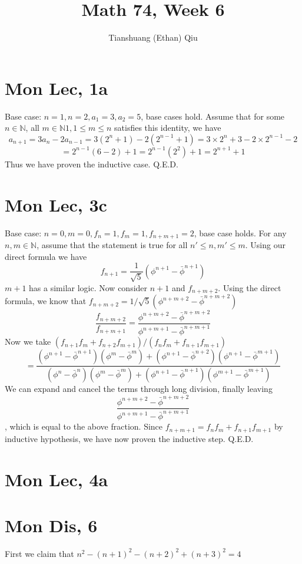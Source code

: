 \documentclass[12pt]{article}
\author{Tianshuang (Ethan) Qiu}
\newcommand{\N}{\mathbb{N}}
\begin{document}
\title{Math 74, Week 6}
\maketitle

\section{Mon Lec, 1a}
Base case: $n=1, n=2, a_1=3, a_2=5$, base cases hold.
\newline
Assume that for some $n \in \N$, all $m \in \N 1, 1 \leq m \leq n$ satisfies this identity, we have
$$a_{n+1}=3a_n-2a_{n-1}=3(2^n+1)-2(2^{n-1}+1)=3\times 2^n+3-2\times 2^{n-1}-2$$
$$=2^{n-1}(6-2)+1=2^{n-1}(2^2)+1=2^{n+1}+1$$
Thus we have proven the inductive case. Q.E.D.

\section{Mon Lec, 3c}
Base case: $n=0, m=0, f_n=1, f_m=1, f_{n+m+1}=2$, base case holds.
\newline
For any $n, m \in \N$, assume that the statement is true for all $n'\leq n, m' \leq m$. Using our direct formula we have
$$f_{n+1}=\frac{1}{\sqrt 5} (\phi^{n+1} - \bar \phi^{n+1})$$
$m+1$ has a similar logic. Now consider $n+1$ and $f_{n+m+2}$.
\newline
Using the direct formula, we know that $f_{n+m+2}=1/\sqrt5 (\phi^{n+m+2} - \bar \phi^{n+m+2})$
$$\frac{f_{n+m+2}}{f_{n+m+1}} = \frac{\phi^{n+m+2} - \bar \phi^{n+m+2}}{\phi^{n+m+1} - \bar \phi^{n+m+1}}$$
\newline
Now we take $(f_{n+1}f_m+f_{n+2}f_{m+1})/(f_{n}f_{m}+f_{n+1}f_{m+1})$
$$=\frac{(\phi^{n+1}-\bar\phi^{n+1})(\phi^{m}-\bar\phi^{m})+(\phi^{n+1}-\bar\phi^{n+2})(\phi^{n+1}-\bar\phi^{m+1})}{(\phi^{n}-\bar\phi^{n})(\phi^{m}-\bar\phi^{m})+(\phi^{n+1}-\bar\phi^{n+1})(\phi^{m+1}-\bar\phi^{m+1})}$$
We can expand and cancel the terms through long division, finally leaving $$\frac{\phi^{n+m+2} - \bar \phi^{n+m+2}}{\phi^{n+m+1} - \bar \phi^{n+m+1}}$$, which is equal to the above fraction. Since $f_{n+m+1}=f_nf_m+f_{n+1}f_{m+1}$ by inductive hypothesis, we have now proven the inductive step. Q.E.D.

\section{Mon Lec, 4a}

\section{Mon Dis, 6}
First we claim that $n^2-(n+1)^2-(n+2)^2+(n+3)^2=4$
\end{document}
